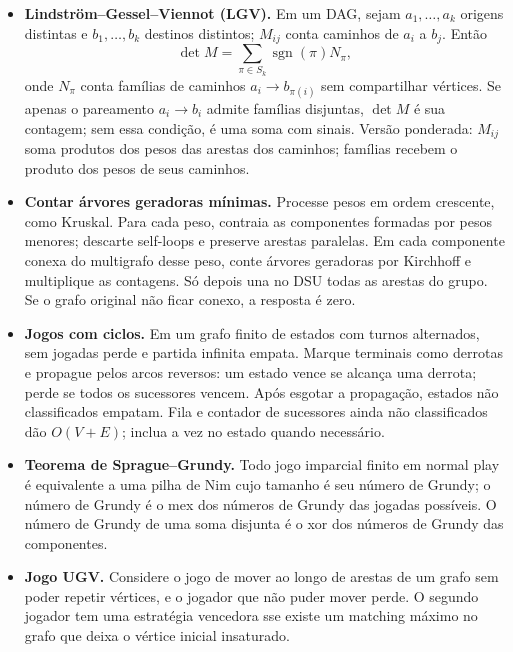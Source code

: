 \begin{itemize}[leftmargin=*,label={}]
\item \textbf{Lindström--Gessel--Viennot (LGV).}
Em um DAG, sejam $a_1,\ldots,a_k$ origens distintas e $b_1,\ldots,b_k$ destinos distintos; $M_{ij}$ conta caminhos de $a_i$ a $b_j$. Então
\[
 \det M=\sum_{\pi\in S_k}\operatorname{sgn}(\pi)N_\pi,
\]
onde $N_\pi$ conta famílias de caminhos $a_i\to b_{\pi(i)}$ sem compartilhar vértices. Se apenas o pareamento $a_i\to b_i$ admite famílias disjuntas, $\det M$ é sua contagem; sem essa condição, é uma soma com sinais. Versão ponderada: $M_{ij}$ soma produtos dos pesos das arestas dos caminhos; famílias recebem o produto dos pesos de seus caminhos.

\item \textbf{Contar árvores geradoras mínimas.}
Processe pesos em ordem crescente, como Kruskal. Para cada peso, contraia as componentes formadas por pesos menores; descarte self-loops e preserve arestas paralelas. Em cada componente conexa do multigrafo desse peso, conte árvores geradoras por Kirchhoff e multiplique as contagens. Só depois una no DSU todas as arestas do grupo. Se o grafo original não ficar conexo, a resposta é zero.

		\ifextended
\item \textbf{Jogos com ciclos.}
Em um grafo finito de estados com turnos alternados, sem jogadas perde e partida infinita empata. Marque terminais como derrotas e propague pelos arcos reversos: um estado vence se alcança uma derrota; perde se todos os sucessores vencem. Após esgotar a propagação, estados não classificados empatam. Fila e contador de sucessores ainda não classificados dão $O(V+E)$; inclua a vez no estado quando necessário.

	\item \textbf{Teorema de Sprague--Grundy.}
		Todo jogo imparcial finito em normal play é equivalente a uma pilha de Nim cujo tamanho é seu número de Grundy; o número de Grundy é o mex dos números de Grundy das jogadas possíveis. O número de Grundy de uma soma disjunta é o xor dos números de Grundy das componentes.
		\fi

	\item \textbf{Jogo UGV.}
		Considere o jogo de mover ao longo de arestas de um grafo sem poder repetir vértices, e o jogador que não puder mover perde. O segundo jogador tem uma estratégia vencedora sse existe um matching máximo no grafo que deixa o vértice inicial insaturado.

\end{itemize}

